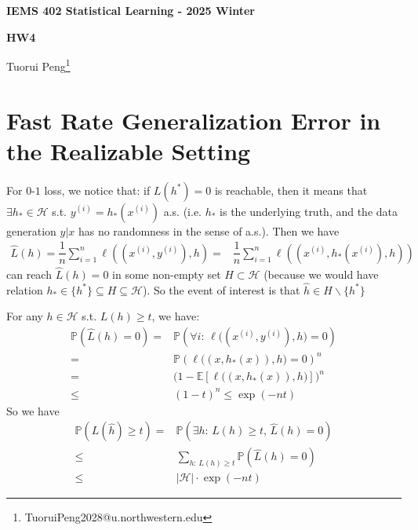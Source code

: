 \documentclass[11pt,a4paper]{ctexart}
\numberwithin{equation}{section}%
\begin{document}
\begin{center}\thispagestyle{plain}

{\LARGE\textbf{IEMS 402 Statistical Learning - 2025 Winter}}

{\Large\textbf{HW4}}

Tuorui Peng\footnote{TuoruiPeng2028@u.northwestern.edu}
\end{center}

\thispagestyle{myheadings}
\pagestyle{myheadings}




\section{Fast Rate Generalization Error in the Realizable Setting}

For $ 0 $-$ 1 $ loss, we notice that: if $ L(h^*)=0 $ is reachable, then it means that $ \exists h_*\in \mathcal{H} $ s.t. $ y^{(i)} = h_*(x^{(i)}) $ a.s. (i.e. $ h_* $ is the underlying truth, and the data generation $ y|x $ has no randomness in the sense of a.s.). Then we have
\begin{align*}
    \hat{L}(h) = \dfrac{ 1 }{ n }\sum_{i=1}^n \ell\left((x^{(i)},y^{(i)}),h\right)  =& \dfrac{ 1 }{ n }\sum_{i=1}^n \ell\left((x^{(i)},h_*(x^{(i)}), h)\right) 
\end{align*}
can reach $ \hat{L}(h) = 0 $ in some non-empty set $ H\subset \mathcal{H} $ (because we would have relation $ h_* \in \{h^*\} \subseteq H \subseteq \mathcal{H} $). So the event of interest is that $ \hat{h}\in H\backslash \{h^*\} $

For any $ h\in\mathcal{H} $ s.t. $ L(h) \geq t $, we have:
\begin{align*}
     \mathbb{P}\left( \hat{L}(h) = 0  \right) =& \mathbb{P}\left( \forall i:\, \ell\big((x^{(i)}, y^{(i)}), h\big) = 0 \right) \\
     =& \mathbb{P}\left( \ell\big((x,h_*(x)) , h\big) = 0 \right)^n   \\
     =& \big(1- \mathbb{E}\left[ \ell\big((x,h_*(x)) , h\big) \right]  \big)^n \\
     \leq & (1-t)^n \leq \exp\left(-nt\right)
\end{align*}
So we have
\begin{align*}
    \mathbb{P}\left( L(\hat{h}) \geq t \right) =& \mathbb{P}\left( \exists h:\,L(h) \geq t,\, \hat{L}(h)=0  \right)  \\
    \leq & \sum_{h:\,L(h) \geq t} \mathbb{P}\left( \hat{L}(h) = 0  \right) \\
    \leq & \left\vert \mathcal{H} \right\vert  \cdot \exp\left( -nt \right)
\end{align*}
\end{document}
